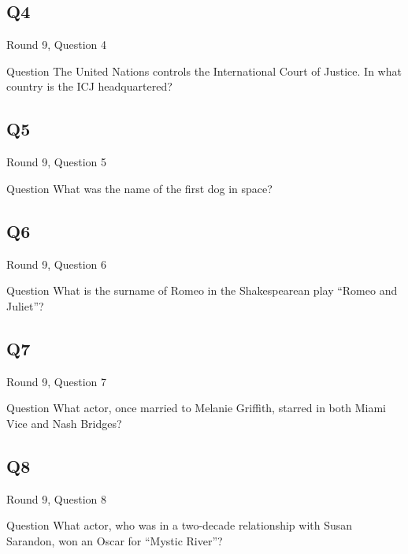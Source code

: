 \documentclass[11pt]{beamer}
\begin{document}
\subsection*{Q4}
\begin{frame}[t]{Round 9, Question 4}
\vspace{2em}
\begin{block}{Question}
The United Nations controls the International Court of Justice. In what country is the ICJ headquartered\@?
\end{block}
\end{frame}
    

\subsection*{Q5}
\begin{frame}[t]{Round 9, Question 5}
\vspace{2em}
\begin{block}{Question}
What was the name of the first dog in space\@?
\end{block}
\end{frame}
    

\subsection*{Q6}
\begin{frame}[t]{Round 9, Question 6}
\vspace{2em}
\begin{block}{Question}
What is the surname of Romeo in the Shakespearean play ``Romeo and Juliet''\@?
\end{block}
\end{frame}
    

\subsection*{Q7}
\begin{frame}[t]{Round 9, Question 7}
\vspace{2em}
\begin{block}{Question}
What actor, once married to Melanie Griffith, starred in both Miami Vice and Nash Bridges\@?
\end{block}
\end{frame}
    

\subsection*{Q8}
\begin{frame}[t]{Round 9, Question 8}
\vspace{2em}
\begin{block}{Question}
What actor, who was in a two-decade relationship with Susan Sarandon, won an Oscar for ``Mystic River''\@?
\end{block}
\end{frame}
    
\end{document}
